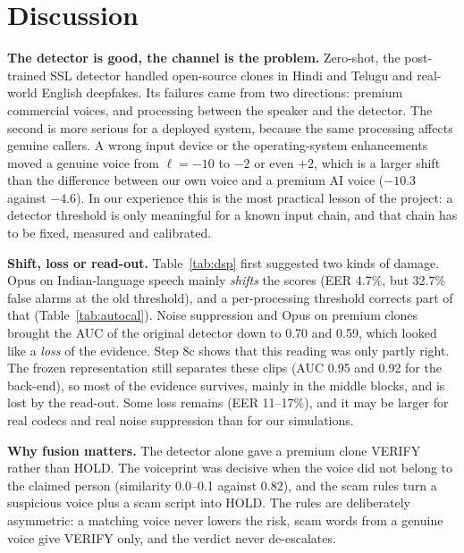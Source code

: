 \documentclass[10pt,a4paper,twocolumn]{article}
\newcommand{\llr}{\ell}
\begin{document}
\FloatBarrier
\section{Discussion}
\textbf{The detector is good, the channel is the problem.} Zero-shot, the post-trained SSL detector handled open-source clones in Hindi and Telugu and real-world English deepfakes. Its failures came from two directions: premium commercial voices, and processing between the speaker and the detector. The second is more serious for a deployed system, because the same processing affects genuine callers. A wrong input device or the operating-system enhancements moved a genuine voice from $\llr=-10$ to $-2$ or even $+2$, which is a larger shift than the difference between our own voice and a premium AI voice ($-10.3$ against $-4.6$). In our experience this is the most practical lesson of the project: a detector threshold is only meaningful for a known input chain, and that chain has to be fixed, measured and calibrated.

\textbf{Shift, loss or read-out.} Table~\ref{tab:dsp} first suggested two kinds of damage. Opus on Indian-language speech mainly \emph{shifts} the scores (EER 4.7\%, but 32.7\% false alarms at the old threshold), and a per-processing threshold corrects part of that (Table~\ref{tab:autocal}). Noise suppression and Opus on premium clones brought the AUC of the original detector down to 0.70 and 0.59, which looked like a \emph{loss} of the evidence. Step 8c shows that this reading was only partly right. The frozen representation still separates these clips (AUC 0.95 and 0.92 for the back-end), so most of the evidence survives, mainly in the middle blocks, and is lost by the read-out. Some loss remains (EER 11--17\%), and it may be larger for real codecs and real noise suppression than for our simulations.

\textbf{Why fusion matters.} The detector alone gave a premium clone VERIFY rather than HOLD. The voiceprint was decisive when the voice did not belong to the claimed person (similarity 0.0--0.1 against 0.82), and the scam rules turn a suspicious voice plus a scam script into HOLD. The rules are deliberately asymmetric: a matching voice never lowers the risk, scam words from a genuine voice give VERIFY only, and the verdict never de-escalates.
\end{document}
